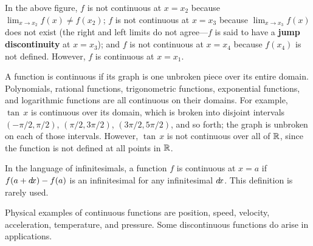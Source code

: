 \noindent In the above figure, $f$ is not continuous at $x = x_2$ because
$\lim_{x \to x_2} f(x) \ne f(x_2)$; $f$ is not continuous at $x = x_3$ because
$\lim_{x \to x_3} f(x)$ does not exist (the right and left limits do not
agree---$f$ is said to have a
\textbf{jump discontinuity} at $x = x_3$); and $f$ is
not continuous at $x = x_4$ because $f(x_4)$ is not defined. However, $f$ is
continuous at $x = x_1$.

A function is continuous if its graph is one unbroken piece over its entire
domain. Polynomials, rational functions, trigonometric functions, exponential
functions, and logarithmic functions are all continuous on their domains. For
example, $\tan\,x$ is continuous over its domain,
which is broken into disjoint intervals $(-\pi/2,\pi/2)$, $(\pi/2,3\pi/2)$,
$(3\pi/2,5\pi/2)$, and so forth; the graph is unbroken on each of those
intervals. However, $\tan\,x$ is not continuous over all of $\mathbb{R}$, since the
function is not defined at all points in $\mathbb{R}$.

In the language of infinitesimals, a function $f$ is continuous at $x=a$ if
$f(a+d\!x) - f(a)$ is an infinitesimal for any infinitesimal $d\!x$. This
definition is rarely used.

Physical examples of continuous functions are position, speed, velocity,
acceleration, temperature, and pressure. Some discontinuous functions do
arise in applications.

